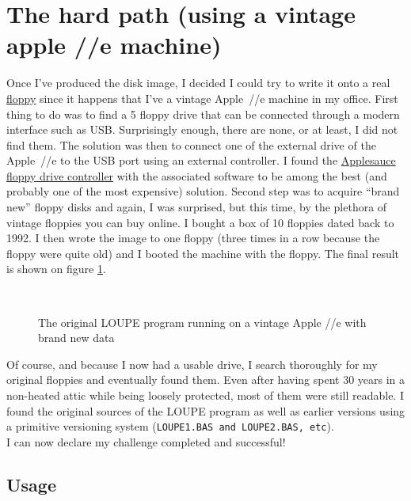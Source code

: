 \section*{The hard path (using a vintage apple //e machine)}

Once I've produced the disk image, I decided I could try to write it onto a
real \href{https://en.wikipedia.org/wiki/History_of_the_floppy_disk}{floppy}
since it happens that I've a vintage Apple~//e machine in my office. First
thing to do was to find a 5 floppy drive that can
be connected through a modern interface such as USB. Surprisingly enough, there
are none, or at least, I did not find them. The solution was then to connect
one of the external drive of the Apple~//e to the USB port using an external
controller. I found the
\href{https://applesaucefdc.com/}{Applesauce floppy drive controller} with
the associated software to be among the best (and probably one of the most
expensive) solution. Second step was to acquire ``brand new'' floppy disks and
again, I was surprised, but this time, by the plethora of vintage floppies you
can buy online. I bought a box of 10 floppies dated back to 1992. I then wrote
the image to one floppy (three times in a row because the floppy were quite
old) and I booted the machine with the floppy. The final result is shown on figure \ref{fig:final}.
%
\begin{figure}
{%
\fboxsep=0pt
\hfill
{}
}\\
\caption{The original LOUPE program running on a vintage Apple //e with brand new data}
\label{fig:final}
\end{figure}

Of course, and because I now had a usable drive, I search thoroughly for my
original floppies and eventually found them. Even after having spent 30 years
in a non-heated attic while being loosely protected, most of them were still
readable. I found the original sources of the LOUPE program as well as earlier
versions using a primitive versioning system ({\tt LOUPE1.BAS and LOUPE2.BAS,
etc}).\\

I can now declare my challenge completed and successful!

\subsection*{Usage}

